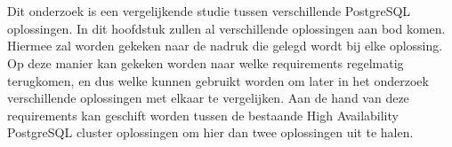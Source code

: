 \chapter{}
\label{ch:stand-van-zaken}

Dit onderzoek is een vergelijkende studie tussen verschillende PostgreSQL oplossingen. In dit hoofdstuk zullen al verschillende oplossingen aan bod komen. Hiermee zal worden gekeken naar de nadruk die gelegd wordt bij elke oplossing. Op deze manier kan gekeken worden naar welke requirements regelmatig terugkomen, en dus welke kunnen gebruikt worden om later in het onderzoek verschillende oplossingen met elkaar te vergelijken. Aan de hand van deze requirements kan geschift worden tussen de bestaande High Availability PostgreSQL cluster oplossingen om hier dan twee oplossingen uit te halen. 


